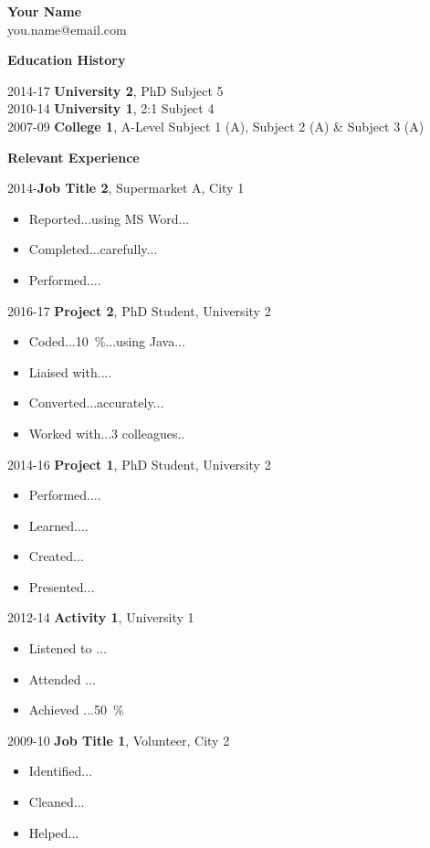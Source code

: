 \documentclass[11pt]{report}
\begin{document}
{\centering \huge \textbf{Your Name} \\} 
\smallskip
{ \qquad you.name@email.com \\}
\smallskip

\textbf{Education History}

2014-17 \qquad \textbf{University 2}, PhD Subject 5 \\
2010-14 \qquad \textbf{University 1}, 2:1 Subject 4 \\
2007-09 \qquad \textbf{College 1}, A-Level Subject 1 (A), Subject 2 (A) \& Subject 3 (A) 

\textbf{Relevant Experience} 

2014-\space\space\space\space  \qquad \textbf{Job Title 2}, Supermarket A, City 1 
\begin{itemize}
	\item Reported...using MS Word... 
	\item Completed...carefully...  
	\item Performed.... 
\end{itemize}

2016-17 \qquad \textbf{Project 2}, PhD Student, University 2  
\begin{itemize}
	\item Coded...\qty{10}{\percent}...using Java...  
	\item Liaised with....
	\item Converted...accurately...
	\item Worked with...3 colleagues.. 
\end{itemize}	


2014-16 \qquad \textbf{Project 1}, PhD Student, University 2 
\begin{itemize}
	\item Performed.... 
	\item Learned....
	\item Created...
	\item Presented...  
\end{itemize}


2012-14 \qquad \textbf{Activity 1}, University 1 
\begin{itemize}
	\item Listened to ...
	\item Attended ...
	\item Achieved ...\qty{50}{\percent}
\end{itemize}

2009-10 \qquad \textbf{Job Title 1}, Volunteer, City 2 
\begin{itemize}
	\item Identified...
	\item Cleaned... 
	\item Helped... 
\end{itemize}
\end{document}
